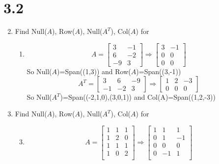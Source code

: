 \documentclass[letterpaper]{article}
\begin{document}
\section*{3.2}
\begin{enumerate}
\setcounter{enumi}{1}
\item
Find Null($A$), Row($A$), Null($A^T$), Col($A$) for
  \begin{enumerate}
  \item
  \[
  A=
  \left[\begin{array}{rr}
    3&-1\\
    6&-2\\
    -9&3
  \end{array}\right]
  \Rightarrow
  \left[\begin{array}{rr}
    3&-1\\
    0&0\\
    0&0
  \end{array}\right]
  \]
  So Null($A$)=Span((1,3)) and Row($A$)=Span((3,-1))
  \[
  A^T=
  \left[\begin{array}{rrr}
    3&6&-9\\
    -1&-2&3
  \end{array}\right]
  \Rightarrow
  \left[\begin{array}{rrr}
    1&2&-3\\
    0&0&0
  \end{array}\right]
  \]
  So Null($A^T$)=Span((-2,1,0),(3,0,1)) and Col(A)=Span((1,2,-3))
  \end{enumerate}
\item
Find Null($A$), Row($A$), Null($A^T$), Col($A$) for
  \begin{enumerate}
  \setcounter{enumii}{2}
  \item
  \[
  A=
  \left[\begin{array}{rrr}
    1&1&1\\
    1&2&0\\
    1&1&1\\
    1&0&2\\
  \end{array}\right]
  \Rightarrow
  \left[\begin{array}{rrr}
    1&1&1\\
    0&1&-1\\
    0&0&0\\
    0&-1&1\\
  \end{array}\right]
\]
\end{enumerate}
\end{enumerate}
\end{document}
